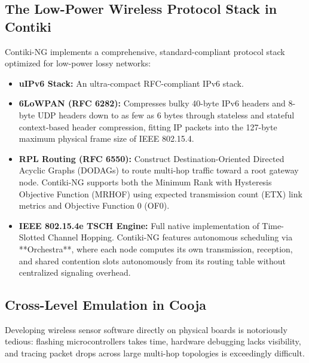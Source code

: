 \subsection{The Low-Power Wireless Protocol Stack in Contiki}
Contiki-NG implements a comprehensive, standard-compliant protocol stack optimized for low-power lossy networks:
\begin{itemize}
    \item \textbf{uIPv6 Stack:} An ultra-compact RFC-compliant IPv6 stack.
    \item \textbf{6LoWPAN (RFC 6282):} Compresses bulky 40-byte IPv6 headers and 8-byte UDP headers down to as few as 6 bytes through stateless and stateful context-based header compression, fitting IP packets into the 127-byte maximum physical frame size of IEEE 802.15.4.
    \item \textbf{RPL Routing (RFC 6550):} Construct Destination-Oriented Directed Acyclic Graphs (DODAGs) to route multi-hop traffic toward a root gateway node. Contiki-NG supports both the Minimum Rank with Hysteresis Objective Function (MRHOF) using expected transmission count (ETX) link metrics and Objective Function 0 (OF0).
    \item \textbf{IEEE 802.15.4e TSCH Engine:} Full native implementation of Time-Slotted Channel Hopping. Contiki-NG features autonomous scheduling via **Orchestra**, where each node computes its own transmission, reception, and shared contention slots autonomously from its routing table without centralized signaling overhead.
\end{itemize}

\subsection{Cross-Level Emulation in Cooja}
Developing wireless sensor software directly on physical boards is notoriously tedious: flashing microcontrollers takes time, hardware debugging lacks visibility, and tracing packet drops across large multi-hop topologies is exceedingly difficult.

